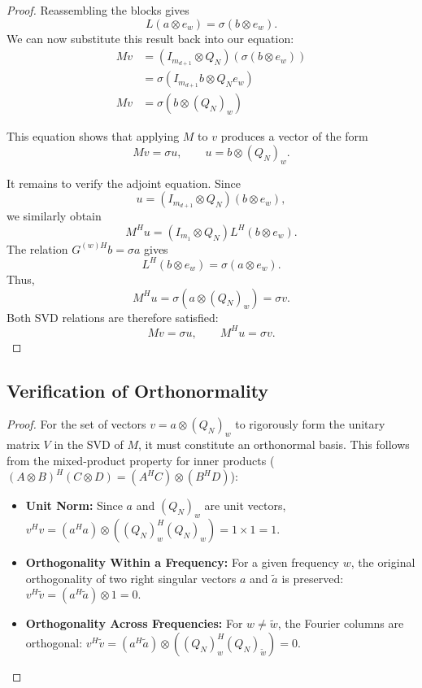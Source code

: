 \begin{proof}
Reassembling the blocks gives
\begin{equation}
L(a \otimes e_w) = \sigma(b \otimes e_w).
\end{equation}
We can now substitute this result back into our equation:
\begin{align*}
M v &= (I_{m_{d+1}} \otimes Q_N) \left( \sigma (b \otimes e_w) \right) \\
&= \sigma \left( I_{m_{d+1}} b \otimes Q_N e_w \right) \\
M v &= \sigma \left( b \otimes (Q_N)_w \right)
\end{align*}

This equation shows that applying $M$ to $v$ produces a vector of the form
\[
    Mv=\sigma u,
    \qquad
    u=b\otimes (Q_N)_w.
\]

It remains to verify the adjoint equation. Since
\[
    u=(I_{m_{d+1}}\otimes Q_N)(b\otimes e_w),
\]
we similarly obtain
\[
    M^H u
    =
    (I_{m_1}\otimes Q_N)L^H(b\otimes e_w).
\]
The relation $G^{(w)H}b=\sigma a$ gives
\[
    L^H(b\otimes e_w)=\sigma(a\otimes e_w).
\]
Thus,
\[
    M^Hu
    =
    \sigma(a\otimes (Q_N)_w)
    =
    \sigma v.
\]
Both SVD relations are therefore satisfied:
\[
    Mv=\sigma u,
    \qquad
    M^Hu=\sigma v.
\]

\end{proof}

\subsection{Verification of Orthonormality}

\begin{proof}

For the set of vectors $v = a \otimes (Q_N)_w$ to rigorously form the unitary matrix $V$ in the SVD of $M$, it must constitute an orthonormal basis. This follows from the mixed-product property for inner products ($(A \otimes B)^H (C \otimes D) = (A^H C) \otimes (B^H D)$):

\begin{itemize}
    \item \textbf{Unit Norm:} Since $a$ and $(Q_N)_w$ are unit vectors, $v^H v = (a^H a) \otimes ((Q_N)_w^H (Q_N)_w) = 1 \times 1 = 1$.
    \item \textbf{Orthogonality Within a Frequency:} For a given frequency $w$, the original orthogonality of two right singular vectors $a$ and $\tilde{a}$ is preserved: $v^H \tilde{v} = (a^H \tilde{a}) \otimes 1 = 0$.
    \item \textbf{Orthogonality Across Frequencies:} For $w \neq \tilde{w}$, the Fourier columns are orthogonal: $v^H \tilde{v} = (a^H \tilde{a}) \otimes ((Q_N)_w^H (Q_N)_{\tilde{w}}) = 0$.

\end{itemize}

\end{proof}

